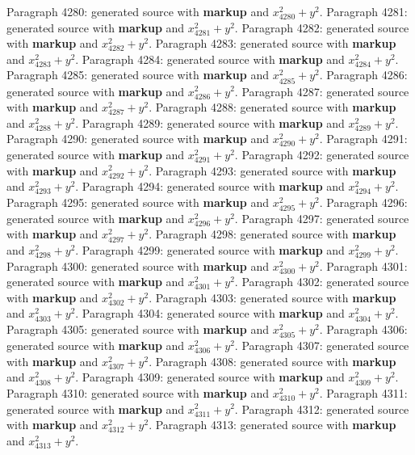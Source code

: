 \documentclass{article}
\begin{document}
Paragraph 4280: generated source with \textbf{markup} and $x_{4280}^2 + y^2$.
Paragraph 4281: generated source with \textbf{markup} and $x_{4281}^2 + y^2$.
Paragraph 4282: generated source with \textbf{markup} and $x_{4282}^2 + y^2$.
Paragraph 4283: generated source with \textbf{markup} and $x_{4283}^2 + y^2$.
Paragraph 4284: generated source with \textbf{markup} and $x_{4284}^2 + y^2$.
Paragraph 4285: generated source with \textbf{markup} and $x_{4285}^2 + y^2$.
Paragraph 4286: generated source with \textbf{markup} and $x_{4286}^2 + y^2$.
Paragraph 4287: generated source with \textbf{markup} and $x_{4287}^2 + y^2$.
Paragraph 4288: generated source with \textbf{markup} and $x_{4288}^2 + y^2$.
Paragraph 4289: generated source with \textbf{markup} and $x_{4289}^2 + y^2$.
Paragraph 4290: generated source with \textbf{markup} and $x_{4290}^2 + y^2$.
Paragraph 4291: generated source with \textbf{markup} and $x_{4291}^2 + y^2$.
Paragraph 4292: generated source with \textbf{markup} and $x_{4292}^2 + y^2$.
Paragraph 4293: generated source with \textbf{markup} and $x_{4293}^2 + y^2$.
Paragraph 4294: generated source with \textbf{markup} and $x_{4294}^2 + y^2$.
Paragraph 4295: generated source with \textbf{markup} and $x_{4295}^2 + y^2$.
Paragraph 4296: generated source with \textbf{markup} and $x_{4296}^2 + y^2$.
Paragraph 4297: generated source with \textbf{markup} and $x_{4297}^2 + y^2$.
Paragraph 4298: generated source with \textbf{markup} and $x_{4298}^2 + y^2$.
Paragraph 4299: generated source with \textbf{markup} and $x_{4299}^2 + y^2$.
Paragraph 4300: generated source with \textbf{markup} and $x_{4300}^2 + y^2$.
Paragraph 4301: generated source with \textbf{markup} and $x_{4301}^2 + y^2$.
Paragraph 4302: generated source with \textbf{markup} and $x_{4302}^2 + y^2$.
Paragraph 4303: generated source with \textbf{markup} and $x_{4303}^2 + y^2$.
Paragraph 4304: generated source with \textbf{markup} and $x_{4304}^2 + y^2$.
Paragraph 4305: generated source with \textbf{markup} and $x_{4305}^2 + y^2$.
Paragraph 4306: generated source with \textbf{markup} and $x_{4306}^2 + y^2$.
Paragraph 4307: generated source with \textbf{markup} and $x_{4307}^2 + y^2$.
Paragraph 4308: generated source with \textbf{markup} and $x_{4308}^2 + y^2$.
Paragraph 4309: generated source with \textbf{markup} and $x_{4309}^2 + y^2$.
Paragraph 4310: generated source with \textbf{markup} and $x_{4310}^2 + y^2$.
Paragraph 4311: generated source with \textbf{markup} and $x_{4311}^2 + y^2$.
Paragraph 4312: generated source with \textbf{markup} and $x_{4312}^2 + y^2$.
Paragraph 4313: generated source with \textbf{markup} and $x_{4313}^2 + y^2$.
\end{document}
